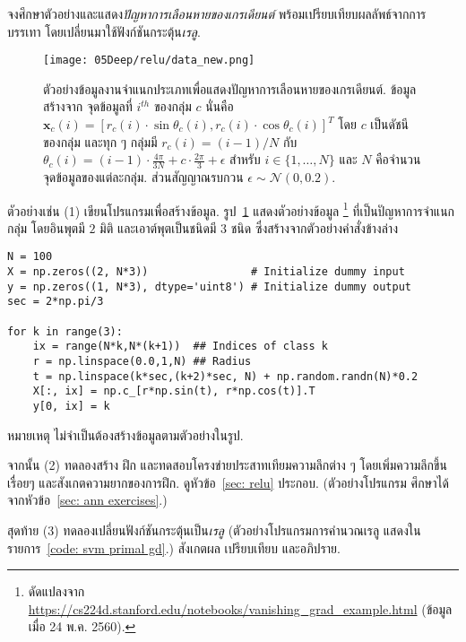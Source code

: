 \begin{Exercise}
	\label{ex: vanishing gradient}
	
จงศึกษาตัวอย่างและแสดง\textit{ปัญหาการเลือนหายของเกรเดียนต์}
พร้อมเปรียบเทียบผลลัพธ์จากการบรรเทา โดยเปลี่ยนมาใช้ฟังก์ชันกระตุ้น\textit{เรลู}.

%
\begin{figure}[H]
	\begin{center}
	\texttt{[image: 05Deep/relu/data\_new.png]}
	\end{center}
	\caption[ตัวอย่างข้อมูลสำหรับแสดงปัญหาการเลือนหายของเกรเดียนต์]{ตัวอย่างข้อมูลงานจำแนกประเภทเพื่อแสดงปัญหาการเลือนหายของเกรเดียนต์.
		ข้อมูลสร้างจาก จุดข้อมูลที่ $i^{th}$ ของกลุ่ม $c$ 
		นั่นคือ $\bm{x}_c(i) = [r_c(i) \cdot \sin \theta_c(i), r_c(i) \cdot \cos \theta_c(i)]^T$
		โดย $c$ เป็นดัชนีของกลุ่ม
		และทุก ๆ กลุ่มมี $r_c(i) = (i-1)/N$ 
		กับ $\theta_c(i) = (i-1) \cdot \frac{4 \pi}{3 N} + c \cdot \frac{2 \pi}{3} + \epsilon$
		สำหรับ $i \in \{1, \ldots, N\}$ และ $N$ คือจำนวนจุดข้อมูลของแต่ละกลุ่ม.
		ส่วนสัญญาณรบกวน $\epsilon \sim \mathcal{N}(0, 0.2)$.
	}
	\label{fig: deep vanishing gradient data}
\end{figure}
%

ตัวอย่างเช่น
(1) เขียนโปรแกรมเพื่อสร้างข้อมูล.
รูป~\ref{fig: deep vanishing gradient data}
แสดงตัวอย่างข้อมูล%
\footnote{%
ดัดแปลงจาก \url{https://cs224d.stanford.edu/notebooks/vanishing_grad_example.html} (ข้อมูลเมื่อ 24 พ.ค. 2560).
}
ที่เป็นปัญหาการจำแนกกลุ่ม โดยอินพุตมี $2$ มิติ และเอาต์พุตเป็นชนิดมี $3$ ชนิด
ซึ่งสร้างจากตัวอย่างคำสั่งข้างล่าง
\begin{Verbatim}[fontsize=\small]
N = 100
X = np.zeros((2, N*3))                # Initialize dummy input
y = np.zeros((1, N*3), dtype='uint8') # Initialize dummy output
sec = 2*np.pi/3

for k in range(3):
    ix = range(N*k,N*(k+1))  ## Indices of class k
    r = np.linspace(0.0,1,N) ## Radius
    t = np.linspace(k*sec,(k+2)*sec, N) + np.random.randn(N)*0.2 
	X[:, ix] = np.c_[r*np.sin(t), r*np.cos(t)].T   
	y[0, ix] = k
\end{Verbatim}

หมายเหตุ ไม่จำเป็นต้องสร้างข้อมูลตามตัวอย่างในรูป.

จากนั้น (2)
ทดลองสร้าง ฝึก และทดสอบโครงข่ายประสาทเทียมความลึกต่าง ๆ
โดยเพิ่มความลึกขึ้นเรื่อยๆ และสังเกตความยากของการฝึก.
ดูหัวข้อ~\ref{sec: relu} ประกอบ.
(ตัวอย่างโปรแกรม ศึกษาได้จากหัวข้อ~\ref{sec: ann exercises}.)

สุดท้าย (3)
ทดลองเปลี่ยนฟังก์ชันกระตุ้นเป็น\textit{เรลู}
(ตัวอย่างโปรแกรมการคำนวณเรลู แสดงในรายการ~\ref{code: svm primal gd}.)
สังเกตผล เปรียบเทียบ และอภิปราย.

	
\end{Exercise}

